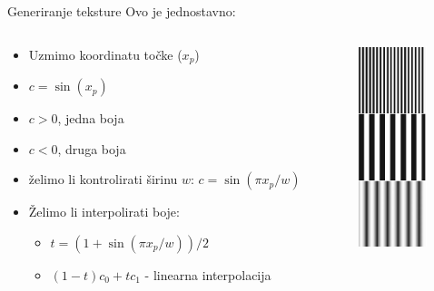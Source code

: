 \documentclass[9pt]{beamer}
\begin{document}
\begin{frame}{Generiranje teksture}
	Ovo je jednostavno:
	\begin{columns}
		\begin{column}{0.5\textwidth}
			\begin{itemize}
				\item Uzmimo koordinatu točke ($x_p$)
				\item $c =\sin (x_p)$
				\item $c >0$, jedna boja
				\item $c <0$, druga boja
				\item želimo li kontrolirati širinu $w$: $c =\sin (\pi x_p / w)$
				\item Želimo li interpolirati boje: 
				\begin{itemize}
					\item $t = (1 + \sin (\pi x_p / w))/2$
					\item $(1-t)c_0 + t c_1$ - linearna interpolacija
				\end{itemize}
			\end{itemize}
		\end{column}
		\begin{column}{0.5\textwidth}
			\begin{center}
				\includegraphics[width=2cm]{slike/stripes_teksture.png}
			\end{center}
		\end{column}
	\end{columns}
\end{frame}
\end{document}

